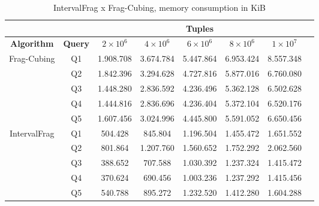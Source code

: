 \begin{table}[!ht]
  \centering
  \caption{IntervalFrag x Frag-Cubing, memory consumption in KiB}\label{tab:interval_memory}
  \begin{tabular}{|c|c|c|c|c|c|c|c|}
    \hline
    & & \multicolumn{5}{c|}{\textbf{Tuples}} \\
    \hline
    \bfseries Algorithm & \bfseries Query & \bfseries $2\times10^6$ & \bfseries $4\times10^6$ & \bfseries $6\times10^6$ & \bfseries $8\times10^6$ & \bfseries $1\times10^7$\\
    \hline
    \multirow{5}{*}{Frag-Cubing} & Q1 &
    1.908.708 & 3.674.784 & 5.447.864 & 6.953.424 & 8.557.348
    \\\cline{2-7} & Q2 &
    1.842.396 & 3.294.628 & 4.727.816 & 5.877.016 & 6.760.080
    \\\cline{2-7} & Q3 &
    1.448.280 & 2.836.592 & 4.236.496 & 5.362.128 & 6.502.628
    \\\cline{2-7} & Q4 &
    1.444.816 & 2.836.696 & 4.236.404 & 5.372.104 & 6.520.176
    \\\cline{2-7} & Q5 &
    1.607.456 & 3.024.996 & 4.445.800 & 5.591.052 & 6.650.456
    \\\hline
    \multirow{5}{*}{IntervalFrag} & Q1 &
    504.428 & 845.804 & 1.196.504 & 1.455.472 & 1.651.552
    \\\cline{2-7}
    & Q2 &
    801.864 & 1.207.760 & 1.560.652 & 1.752.292 & 2.062.560
    \\\cline{2-7} & Q3 &
    388.652 & 707.588 & 1.030.392 & 1.237.324 & 1.415.472
    \\\cline{2-7}
    & Q4 &
    370.624 & 690.456 & 1.003.236 & 1.237.292 & 1.415.456
    \\\cline{2-7}
    & Q5 &
    540.788 & 895.272 & 1.232.520 & 1.412.280 & 1.604.288
    \\\hline
  \end{tabular}
\end{table}

